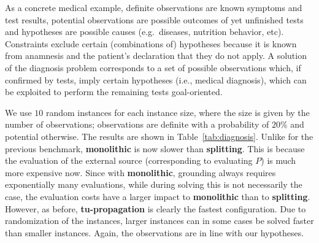 \documentclass[11pt,fleqn,twoside]{article}
\begin{document}
			As a concrete medical example, definite observations are known symptoms and test results,
			potential observations are possible outcomes of yet unfinished tests and hypotheses are possible causes (e.g.~diseases, nutrition behavior, etc).
			Constraints exclude certain (combinations of) hypotheses
			because it is known from anamnesis and the patient's declaration
			that they do not apply.
			A solution of the diagnosis problem corresponds to a set of possible observations which, if confirmed by tests,
			imply certain hypotheses (i.e., medical diagnosis), which can be exploited to perform the remaining tests goal-oriented.

			We use $10$ random instances for each instance size, where the size is given by the number of observations;
			observations are definite with a probability of $20\%$ and potential otherwise.
			The results are shown in Table~\ref{tab:diagnosis}.
			Unlike for the previous benchmark, \textbf{monolithic} is now slower than \textbf{splitting}.
			This is because the evaluation of the external source (corresponding to evaluating $P$) is much more expensive
			now.
			Since with \textbf{monolithic}, grounding always requires exponentially many evaluations, while during solving this is not necessarily the case,
			the evaluation costs have a larger impact to \textbf{monolithic} than to \textbf{splitting}.
			However, as before, \textbf{tu-propagation} is clearly the fastest configuration.
			Due to randomization of the instances, larger instances can in some cases be solved faster than smaller instances.
			Again, the observations are in line with our hypotheses.
\end{document}
